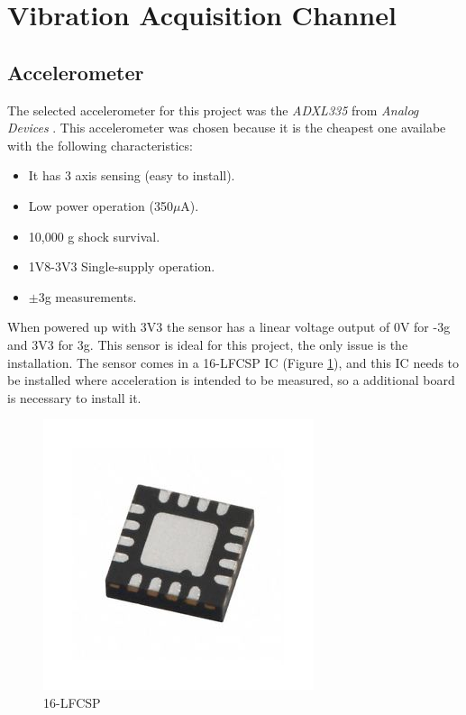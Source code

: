 \section{Vibration Acquisition Channel}\label{sec:vibration-acquisition-channel}

\subsection{Accelerometer}\label{ssec:accelerometer-signal}
	The selected accelerometer for this project was the \textit{ADXL335} from \textit{Analog Devices} \cite{devices2010adxl335}. This accelerometer was chosen because it is the cheapest one availabe with the following characteristics:

	\begin{itemize}
		\item It has 3 axis sensing (easy to install).
		\item Low power operation (350$\mu$A).
		\item 10,000 g shock survival.
		\item 1V8-3V3 Single-supply operation.
		\item $\pm$3g measurements.
	\end{itemize}

	When powered up with 3V3 the sensor has a linear voltage output of 0V for -3g and 3V3 for 3g. This sensor is ideal for this project, the only issue is the installation. The sensor comes in a 16-LFCSP IC (Figure \ref{fig:16lfcsp}), and this IC needs to be installed where acceleration is intended to be measured, so a additional board is necessary to install it. 

	\begin{figure}[htbp]
		\centering
		\includegraphics[width=.5\textwidth]{figuras/fig-16lfcsp.jpg}
		\caption{16-LFCSP \cite{16lfcsp}}
		\label{fig:16lfcsp}
	\end{figure}

